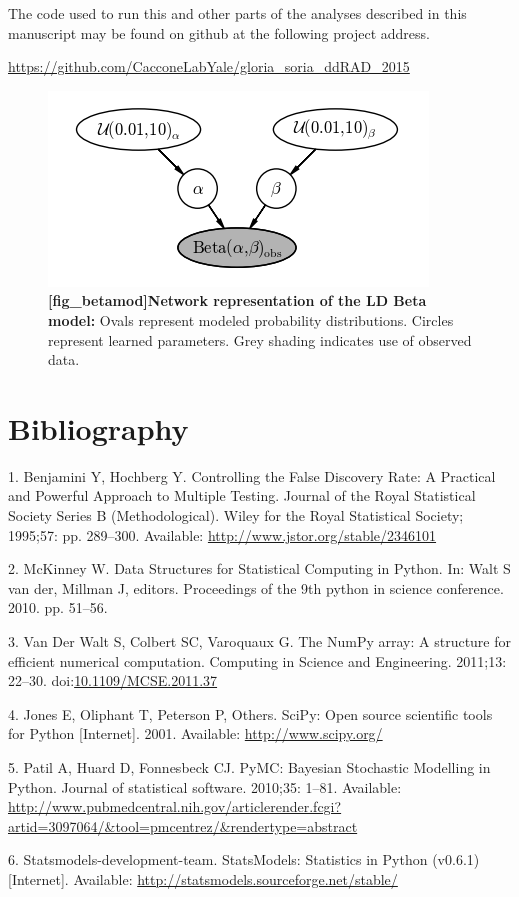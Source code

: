 \documentclass[letterpaper]{scrartcl}
\begin{document}
The code used to run this and other parts of the analyses described in
this manuscript may be found on github at the following project address.

\url{https://github.com/CacconeLabYale/gloria_soria_ddRAD_2015}

\begin{figure}[htbp]
\centering
\includegraphics{../figures/bin_MAP_model.png}
\caption{\textbf{{[}fig\_betamod{]}Network representation of the LD Beta
model:} Ovals represent modeled probability distributions. Circles
represent learned parameters. Grey shading indicates use of observed
data. \label{fig_betamod}}
\end{figure}

\newpage

\section*{Bibliography}\label{bibliography}

1. Benjamini Y, Hochberg Y. Controlling the False Discovery Rate: A
Practical and Powerful Approach to Multiple Testing. Journal of the
Royal Statistical Society Series B (Methodological). Wiley for the Royal
Statistical Society; 1995;57: pp. 289--300. Available:
\url{http://www.jstor.org/stable/2346101}

2. McKinney W. Data Structures for Statistical Computing in Python. In:
Walt S van der, Millman J, editors. Proceedings of the 9th python in
science conference. 2010. pp. 51--56.

3. {Van Der Walt} S, Colbert SC, Varoquaux G. The NumPy array: A
structure for efficient numerical computation. Computing in Science and
Engineering. 2011;13: 22--30.
doi:\href{http://dx.doi.org/10.1109/MCSE.2011.37}{10.1109/MCSE.2011.37}

4. Jones E, Oliphant T, Peterson P, Others. SciPy: Open source
scientific tools for Python {[}Internet{]}. 2001. Available:
\url{http://www.scipy.org/}

5. Patil A, Huard D, Fonnesbeck CJ. PyMC: Bayesian Stochastic Modelling
in Python. Journal of statistical software. 2010;35: 1--81. Available:
\url{http://www.pubmedcentral.nih.gov/articlerender.fcgi?artid=3097064/\&tool=pmcentrez/\&rendertype=abstract}

6. Statsmodels-development-team. StatsModels: Statistics in Python
(v0.6.1) {[}Internet{]}. Available:
\url{http://statsmodels.sourceforge.net/stable/}
\end{document}
